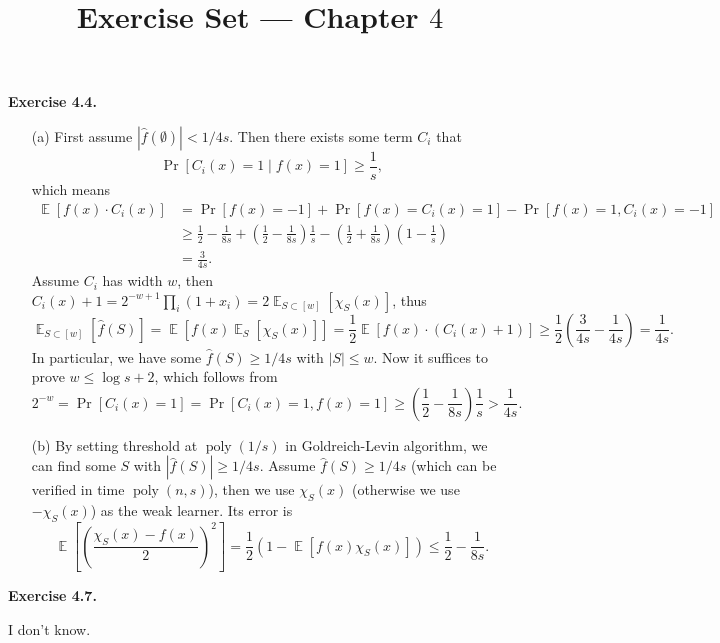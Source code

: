 \documentclass[a4paper]{article}
\title{Exercise Set --- Chapter $4$}
\date{}
\newenvironment{exercise}[1]{
	\par
	\noindent\textbf{Exercise #1.}\quad
}{
	\par
	\bigskip
}
\DeclareMathOperator{\E}{\mathbb E}
\DeclareMathOperator{\poly}{\mathrm{poly}}
\newcommand{\abs}[1]{{\left| #1 \right|}}
\newcommand{\pbra}[1]{{\left( #1 \right)}}
\newcommand{\sbra}[1]{{\left[ #1 \right]}}
\begin{document}
\maketitle

\begin{exercise}{4.4}
    \begin{itemize}
        \item[(a)] First assume $\abs{\hat f(\emptyset)}<1/4s$.
            Then there exists some term $C_i$ that
            $$
            \Pr\sbra{C_i(x)=1\mid f(x)=1}\geq\frac1s,
            $$
            which means
            \begin{align*}
                \E\sbra{f(x)\cdot C_i(x)}
                &=\Pr\sbra{f(x)=-1}+\Pr\sbra{f(x)=C_i(x)=1}-\Pr\sbra{f(x)=1,C_i(x)=-1}\\
                &\geq\frac12-\frac1{8s}+\pbra{\frac12-\frac1{8s}}\frac1s-\pbra{\frac12+\frac1{8s}}\pbra{1-\frac1s}\\
                &=\frac3{4s}.
            \end{align*}
            Assume $C_i$ has width $w$, then $C_i(x)+1=2^{-w+1}\prod_i(1+x_i)=2\E_{S\subset[w]}\sbra{\chi_S(x)}$, thus
            $$
                \E_{S\subset[w]}\sbra{\hat f(S)}
                =\E\sbra{f(x)\E_S\sbra{\chi_S(x)}}
                =\frac12\E\sbra{f(x)\cdot (C_i(x)+1)}
                \geq\frac12\pbra{\frac3{4s}-\frac1{4s}}=\frac1{4s}.
            $$
            In particular, we have some $\hat f(S)\geq1/4s$ with $|S|\leq w$. 
            Now it suffices to prove $w\leq\log s+2$, which follows from 
            $$
            2^{-w}=\Pr\sbra{C_i(x)=1}=\Pr\sbra{C_i(x)=1,f(x)=1}\geq\pbra{\frac12-\frac1{8s}}\frac1s>\frac1{4s}.
            $$
        \item[(b)]
            By setting threshold at $\poly(1/s)$ in Goldreich-Levin algorithm, we can find some $S$ with $\abs{\hat f(S)}\geq1/4s$.
            Assume $\hat f(S)\geq1/4s$ (which can be verified in time $\poly(n,s)$), then we use $\chi_S(x)$ (otherwise we use $-\chi_S(x)$) as the weak learner.
            Its error is 
            $$
            \E\sbra{\pbra{\frac{\chi_S(x)-f(x)}2}^2}=\frac12\pbra{1-\E\sbra{f(x)\chi_S(x)}}\leq\frac12-\frac1{8s}.
            $$
    \end{itemize}
\end{exercise}

\begin{exercise}{4.7}
    I don't know.
\end{exercise}
\end{document}
